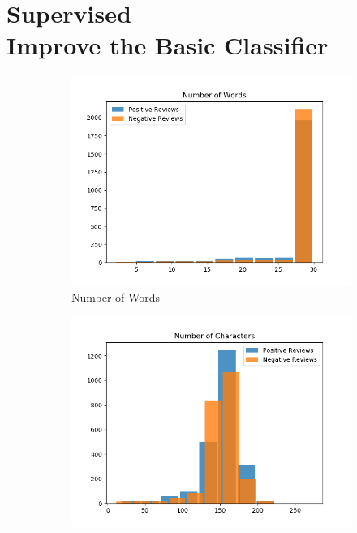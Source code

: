 \section{\textbf{Supervised\\ Improve the Basic Classifier}}

\begin{figure}[!ht]
    \centering
    \begin{subfigure}[b]{0.225\textwidth}
        \centering
        \includegraphics[width=\textwidth]{files/figs/ReviewWord.png}
        \caption[]%
        {{\small Number of Words}}    
        \label{fig:numberofwords}
    \end{subfigure}
    \hfill
    \begin{subfigure}[b]{0.225\textwidth}  
        \centering 
        \includegraphics[width=\textwidth]{files/figs/ReviewCharacter.png}

\end{subfigure}
\end{figure}
